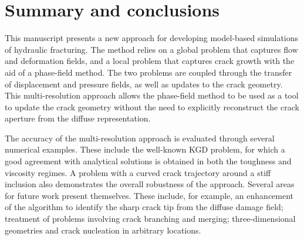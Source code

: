 \section{Summary and conclusions}

This manuscript presents a new approach for developing model-based simulations of hydraulic fracturing. 
The method relies on a global problem that captures flow and deformation fields, and a local problem that captures crack growth with the aid of a phase-field method.  The two problems are coupled through the transfer of displacement and pressure fields, as well as updates to the crack geometry.  This multi-resolution approach allows the phase-field method to be used as a tool to update the crack geometry without the need to explicitly reconstruct the crack aperture from the diffuse representation.  

The accuracy of the multi-resolution approach is evaluated through several numerical examples. These include the well-known KGD problem, for which a good agreement with analytical solutions is obtained in both the toughness and viscosity regimes. A problem with a curved crack trajectory around a stiff inclusion also demonstrates the overall robustness of the approach.  Several areas for future work present themselves. These include, for example, an enhancement of the algorithm to identify the sharp crack tip from the diffuse damage field; treatment of problems involving crack branching and merging; three-dimensional geometries and crack nucleation in arbitrary locations.